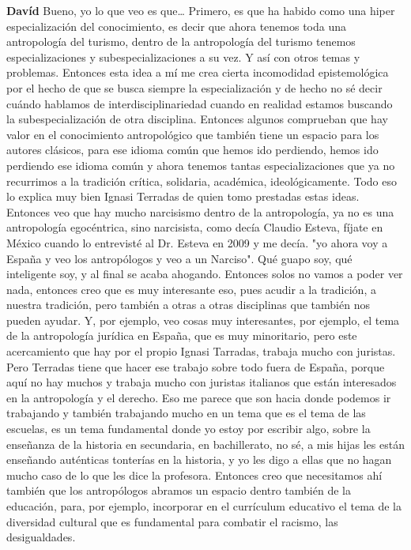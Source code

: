 \documentclass[
  spanish,
  11pt,
  a4paper,
]{scrbook}
\newenvironment{transcripcion}{
    \begin{list}{}{
        \setlength{\leftmargin}{1.5em}  %
        \setlength{\rightmargin}{0em}
        \setlength{\itemsep}{0.2em}     %
        \setlength{\parsep}{0.0em}
        \setlength{\listparindent}{0pt}
    }
}{
    \end{list}
}
\newcommand{\personaje}[1]{\textbf{#1}\quad}
\begin{document}
\begin{transcripcion}
\item \personaje{Davíd} Bueno, yo lo que veo es que… Primero, es que ha habido como una hiper especialización del conocimiento, es decir que ahora tenemos toda una antropología del turismo, dentro de la antropología del turismo tenemos especializaciones y subespecializaciones a su vez. Y así con otros temas y problemas. Entonces esta idea a mí me crea cierta incomodidad epistemológica por el hecho de que se busca siempre la especialización y de hecho no sé decir cuándo hablamos de interdisciplinariedad cuando en realidad estamos buscando la subespecialización de otra disciplina. Entonces algunos comprueban que hay valor en el conocimiento antropológico que también tiene un espacio para los autores clásicos, para ese idioma común que hemos ido perdiendo, hemos ido perdiendo ese idioma común y ahora tenemos tantas especializaciones que ya no recurrimos a la tradición crítica, solidaria, académica, ideológicamente. Todo eso lo explica muy bien Ignasi Terradas de quien tomo prestadas estas ideas. Entonces veo que hay mucho narcisismo dentro de la antropología, ya no es una antropología egocéntrica, sino narcisista, como decía Claudio Esteva, fíjate en México cuando lo entrevisté al Dr. Esteva en 2009 y me decía. "yo ahora voy a España y veo los antropólogos y veo a un Narciso". Qué guapo soy, qué inteligente soy, y al final se acaba ahogando. Entonces solos no vamos a poder ver nada, entonces creo que es muy interesante eso, pues acudir a la tradición, a nuestra tradición, pero también a otras a otras disciplinas que también nos pueden ayudar. Y, por ejemplo, veo cosas muy interesantes, por ejemplo, el tema de la antropología jurídica en España, que es muy minoritario, pero este acercamiento que hay por el propio Ignasi Tarradas, trabaja mucho con juristas. Pero Terradas tiene que hacer ese trabajo sobre todo fuera de España, porque aquí no hay muchos y trabaja mucho con juristas italianos que están interesados en la antropología y el derecho. Eso me parece que son hacia donde podemos ir trabajando y también trabajando mucho en un tema que es el tema de las escuelas, es un tema fundamental donde yo estoy por escribir algo, sobre la enseñanza de la historia en secundaria, en bachillerato, no sé, a mis hijas les están enseñando auténticas tonterías en la historia, y yo les digo a ellas que no hagan mucho caso de lo que les dice la profesora. Entonces creo que necesitamos ahí también que los antropólogos abramos un espacio dentro también de la educación, para, por ejemplo, incorporar en el currículum educativo el tema de la diversidad cultural que es fundamental para combatir el racismo, las desigualdades.


\end{transcripcion}
\end{document}
